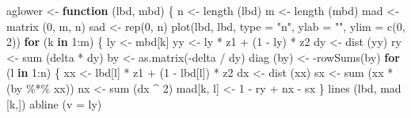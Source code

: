 \documentclass[
  12pt,
]{book}
\newenvironment{Shaded}{\begin{snugshade}}{\end{snugshade}}
\newcommand{\AttributeTok}[1]{\textcolor[rgb]{0.77,0.63,0.00}{#1}}
\newcommand{\ControlFlowTok}[1]{\textcolor[rgb]{0.13,0.29,0.53}{\textbf{#1}}}
\newcommand{\DecValTok}[1]{\textcolor[rgb]{0.00,0.00,0.81}{#1}}
\newcommand{\FunctionTok}[1]{\textcolor[rgb]{0.00,0.00,0.00}{#1}}
\newcommand{\NormalTok}[1]{#1}
\newcommand{\OtherTok}[1]{\textcolor[rgb]{0.56,0.35,0.01}{#1}}
\newcommand{\SpecialCharTok}[1]{\textcolor[rgb]{0.00,0.00,0.00}{#1}}
\newcommand{\StringTok}[1]{\textcolor[rgb]{0.31,0.60,0.02}{#1}}
\theoremstyle{definition}
\theoremstyle{definition}
\theoremstyle{definition}
\theoremstyle{definition}
\theoremstyle{remark}
\begin{document}
\begin{Shaded}
\begin{Highlighting}[]
\NormalTok{aglower }\OtherTok{\textless{}{-}} \ControlFlowTok{function}\NormalTok{ (lbd, mbd) \{}
\NormalTok{  n }\OtherTok{\textless{}{-}} \FunctionTok{length}\NormalTok{ (lbd)}
\NormalTok{  m }\OtherTok{\textless{}{-}} \FunctionTok{length}\NormalTok{ (mbd)}
\NormalTok{  mad }\OtherTok{\textless{}{-}} \FunctionTok{matrix}\NormalTok{ (}\DecValTok{0}\NormalTok{, m, n)}
\NormalTok{  sad }\OtherTok{\textless{}{-}} \FunctionTok{rep}\NormalTok{(}\DecValTok{0}\NormalTok{, n)}
  \FunctionTok{plot}\NormalTok{(lbd,}
\NormalTok{       lbd,}
       \AttributeTok{type =} \StringTok{"n"}\NormalTok{,}
       \AttributeTok{ylab =} \StringTok{""}\NormalTok{,}
       \AttributeTok{ylim =} \FunctionTok{c}\NormalTok{(}\DecValTok{0}\NormalTok{, }\DecValTok{2}\NormalTok{))}
  \ControlFlowTok{for}\NormalTok{ (k }\ControlFlowTok{in} \DecValTok{1}\SpecialCharTok{:}\NormalTok{m) \{}
\NormalTok{    ly }\OtherTok{\textless{}{-}}\NormalTok{ mbd[k]}
\NormalTok{    yy }\OtherTok{\textless{}{-}}\NormalTok{ ly }\SpecialCharTok{*}\NormalTok{ z1 }\SpecialCharTok{+}\NormalTok{ (}\DecValTok{1} \SpecialCharTok{{-}}\NormalTok{ ly) }\SpecialCharTok{*}\NormalTok{ z2}
\NormalTok{    dy }\OtherTok{\textless{}{-}} \FunctionTok{dist}\NormalTok{ (yy)}
\NormalTok{    ry }\OtherTok{\textless{}{-}} \FunctionTok{sum}\NormalTok{ (delta }\SpecialCharTok{*}\NormalTok{ dy)}
\NormalTok{    by }\OtherTok{\textless{}{-}} \FunctionTok{as.matrix}\NormalTok{(}\SpecialCharTok{{-}}\NormalTok{delta }\SpecialCharTok{/}\NormalTok{ dy)}
    \FunctionTok{diag}\NormalTok{ (by) }\OtherTok{\textless{}{-}} \SpecialCharTok{{-}}\FunctionTok{rowSums}\NormalTok{(by)}
    \ControlFlowTok{for}\NormalTok{ (l }\ControlFlowTok{in} \DecValTok{1}\SpecialCharTok{:}\NormalTok{n) \{}
\NormalTok{      xx }\OtherTok{\textless{}{-}}\NormalTok{ lbd[l] }\SpecialCharTok{*}\NormalTok{ z1 }\SpecialCharTok{+}\NormalTok{ (}\DecValTok{1} \SpecialCharTok{{-}}\NormalTok{ lbd[l]) }\SpecialCharTok{*}\NormalTok{ z2}
\NormalTok{      dx }\OtherTok{\textless{}{-}} \FunctionTok{dist}\NormalTok{ (xx)}
\NormalTok{      sx }\OtherTok{\textless{}{-}} \FunctionTok{sum}\NormalTok{ (xx }\SpecialCharTok{*}\NormalTok{ (by }\SpecialCharTok{\%*\%}\NormalTok{ xx))}
\NormalTok{      nx }\OtherTok{\textless{}{-}} \FunctionTok{sum}\NormalTok{ (dx }\SpecialCharTok{\^{}} \DecValTok{2}\NormalTok{)}
\NormalTok{      mad[k, l] }\OtherTok{\textless{}{-}} \DecValTok{1} \SpecialCharTok{{-}}\NormalTok{ ry }\SpecialCharTok{+}\NormalTok{ nx }\SpecialCharTok{{-}}\NormalTok{ sx}
\NormalTok{    \}}
    \FunctionTok{lines}\NormalTok{ (lbd, mad [k,])}
    \FunctionTok{abline}\NormalTok{ (}\AttributeTok{v =}\NormalTok{ ly)}

\end{Highlighting}
\end{Shaded}
\end{document}
